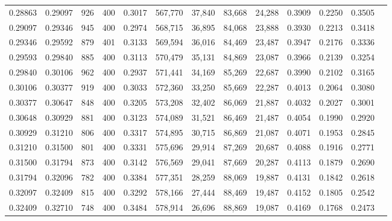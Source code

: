 \begin{tabular}{rrrrrrrrrrrrr}
0.28863 & 0.29097 &    926 & 400 &                                     0.3017 & 567,770 &  37,840 &  83,668 &  24,288 & 0.3909 & 0.2250 & 0.3505 \\
0.29097 & 0.29346 &    945 & 400 &                                     0.2974 & 568,715 &  36,895 &  84,068 &  23,888 & 0.3930 & 0.2213 & 0.3418 \\
0.29346 & 0.29592 &    879 & 401 &                                     0.3133 & 569,594 &  36,016 &  84,469 &  23,487 & 0.3947 & 0.2176 & 0.3336 \\
0.29593 & 0.29840 &    885 & 400 &                                     0.3113 & 570,479 &  35,131 &  84,869 &  23,087 & 0.3966 & 0.2139 & 0.3254 \\
0.29840 & 0.30106 &    962 & 400 &                                     0.2937 & 571,441 &  34,169 &  85,269 &  22,687 & 0.3990 & 0.2102 & 0.3165 \\
0.30106 & 0.30377 &    919 & 400 &                                     0.3033 & 572,360 &  33,250 &  85,669 &  22,287 & 0.4013 & 0.2064 & 0.3080 \\
0.30377 & 0.30647 &    848 & 400 &                                     0.3205 & 573,208 &  32,402 &  86,069 &  21,887 & 0.4032 & 0.2027 & 0.3001 \\
0.30648 & 0.30929 &    881 & 400 &                                     0.3123 & 574,089 &  31,521 &  86,469 &  21,487 & 0.4054 & 0.1990 & 0.2920 \\
0.30929 & 0.31210 &    806 & 400 &                                     0.3317 & 574,895 &  30,715 &  86,869 &  21,087 & 0.4071 & 0.1953 & 0.2845 \\
0.31210 & 0.31500 &    801 & 400 &                                     0.3331 & 575,696 &  29,914 &  87,269 &  20,687 & 0.4088 & 0.1916 & 0.2771 \\
0.31500 & 0.31794 &    873 & 400 &                                     0.3142 & 576,569 &  29,041 &  87,669 &  20,287 & 0.4113 & 0.1879 & 0.2690 \\
0.31794 & 0.32096 &    782 & 400 &                                     0.3384 & 577,351 &  28,259 &  88,069 &  19,887 & 0.4131 & 0.1842 & 0.2618 \\
0.32097 & 0.32409 &    815 & 400 &                                     0.3292 & 578,166 &  27,444 &  88,469 &  19,487 & 0.4152 & 0.1805 & 0.2542 \\
0.32409 & 0.32710 &    748 & 400 &                                     0.3484 & 578,914 &  26,696 &  88,869 &  19,087 & 0.4169 & 0.1768 & 0.2473 \\

\end{tabular}
